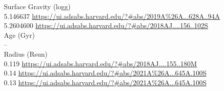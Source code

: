 Surface Gravity (logg) \\
5.146637 \url{https://ui.adsabs.harvard.edu/?#abs/2019A%26A...628A..94A}\\
5.2604600 \url{https://ui.adsabs.harvard.edu/?#abs/2018AJ....156..102S}\\
Age (Gyr)\\
--\\
Radius (Rsun)\\
0.119 \url{https://ui.adsabs.harvard.edu/?#abs/2018AJ....155..180M}\\
0.14 \url{https://ui.adsabs.harvard.edu/?#abs/2021A%26A...645A.100S}\\
0.13 \url{https://ui.adsabs.harvard.edu/?#abs/2021A%26A...645A.100S}\\